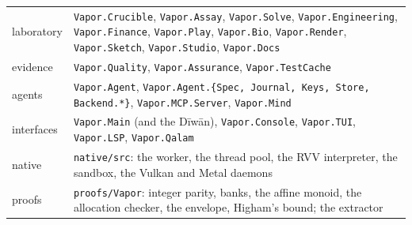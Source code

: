 \begin{small}
\begin{tabularx}{\textwidth}{@{}lX@{}}
laboratory & \texttt{Vapor.Crucible}, \texttt{Vapor.Assay}, \texttt{Vapor.Solve}, \texttt{Vapor.Engineering}, \texttt{Vapor.Finance}, \texttt{Vapor.Play}, \texttt{Vapor.Bio}, \texttt{Vapor.Render}, \texttt{Vapor.Sketch}, \texttt{Vapor.Studio}, \texttt{Vapor.Docs} \\
evidence & \texttt{Vapor.Quality}, \texttt{Vapor.Assurance}, \texttt{Vapor.TestCache} \\
agents & \texttt{Vapor.Agent}, \texttt{Vapor.Agent.\{Spec, Journal, Keys, Store, Backend.*\}}, \texttt{Vapor.MCP.Server}, \texttt{Vapor.Mind} \\
interfaces & \texttt{Vapor.Main} (and the Dīwān), \texttt{Vapor.Console}, \texttt{Vapor.TUI}, \texttt{Vapor.LSP}, \texttt{Vapor.Qalam} \\
native & \texttt{native/src}: the worker, the thread pool, the RVV interpreter, the sandbox, the Vulkan and Metal daemons \\
proofs & \texttt{proofs/Vapor}: integer parity, banks, the affine monoid, the allocation checker, the envelope, Higham's bound; the extractor \\
\bottomrule
\end{tabularx}
\end{small}
